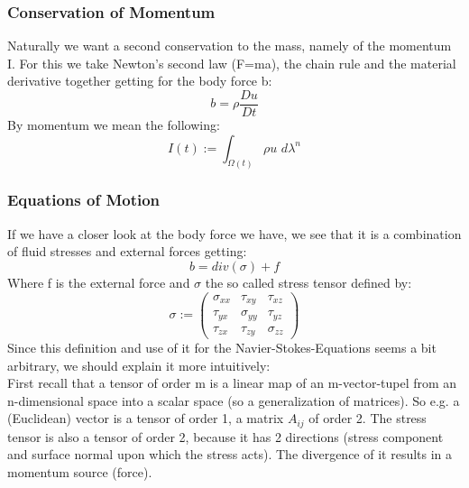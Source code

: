 \documentclass[12pt,a4paper]{report}
\begin{document}
\subsubsection{Conservation of Momentum}
Naturally we want a second conservation to the mass, namely of the momentum I. For this we take Newton's second law (F=ma), the chain rule and the material derivative together getting for the body force b:
\begin{equation}
    b = \rho \frac{Du}{Dt}
\end{equation}
By momentum we mean the following:
\begin{equation}
    I(t) := \int_{\Omega(t)} \rho u \,\, d\lambda^n
\end{equation}
\subsubsection{Equations of Motion}
If we have a closer look at the body force we have, we see that it is a combination of fluid stresses and external forces getting:
\begin{equation}
    b = div(\sigma) + f
\end{equation}
Where f is the external force and \(\sigma\) the so called stress tensor defined by:
\begin{equation}
    \sigma := \begin{pmatrix}
\sigma_{xx} & \tau_{xy} & \tau_{xz}\\
\tau_{yx} & \sigma_{yy} & \tau_{yz}\\
\tau_{zx} & \tau_{zy} & \sigma_{zz}
\end{pmatrix}
\end{equation}
Since this definition and use of it for the Navier-Stokes-Equations seems a bit arbitrary, we should explain it more intuitively:\\
First recall that a tensor of order m is a linear map of an m-vector-tupel from an n-dimensional space into a scalar space (so a generalization of matrices). So e.g. a (Euclidean) vector is a tensor of order 1, a matrix \(A_{ij}\) of order 2. The stress tensor is also a tensor of order 2, because it has 2 directions (stress component and surface normal upon which the stress acts). The divergence of it results in a momentum source (force).
\end{document}
